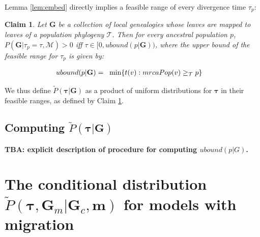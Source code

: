 \documentclass[11pt]{article}
\newcommand{\vect}[1]{\boldsymbol{\mathbf{#1}}}
\newcommand{\M}{\mathcal{M}}
\newcommand{\Tr}{\mathcal{T}}
\newcommand{\G}{\vect{G}}
\newcommand{\Pref}{\widetilde{P}}
\newcommand{\1}{\mathbbm{1}}
\newcommand{\Gc}{\G_c}
\newcommand{\Gm}{\G_m}
\newtheorem{claim}{Claim}
\newcommand{\taus}{\vect\tau}
\newcommand{\migs}{\vect{m}}
\begin{document}
Lemma \ref{lem:embed} directly implies a feasible range of every divergence time $\tau_p$:

\begin{claim}\label{claim:tau_bound_nomig}
 Let $\G$ be a  collection of local genealogies whose leaves are mapped to leaves of a population phylogeny $\Tr$.
 Then for every ancestral population $p$, $P(\G|\tau_p=\tau,\M)>0$ iff $\tau \in [0 , ubound(p|\G) )$, where the upper bound of the feasible range for $\tau_p$
 is given by:
 \begin{small}
 \begin{align}
  ubound(p|\G)   =~~ & \min \{t(v):mrcaPop(v)\anc p\} \label{eq:ubound_nomig}  %
 \end{align}
 \end{small}
\end{claim}

We thus define $\Pref(\taus|\G)$ as a product of uniform distributions for $\taus$ in their feasible ranges, as defined by Claim \ref{claim:tau_bound_nomig}.

\subsection*{Computing $\Pref(\taus|\G)$}

\textbf{TBA: explicit description of procedure for computing $ubound(p|G)$.}

\section{\texorpdfstring{The conditional distribution  $\Pref(\taus,\Gm|\Gc,\migs)$ for models with migration}{Conditional distribution with migration}}\label{ap:cond_mig}
\end{document}
